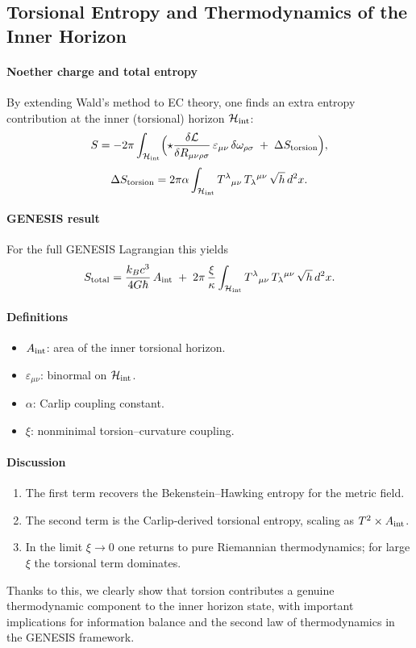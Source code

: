 \documentclass{article}
\begin{document}
\subsection{Torsional Entropy and Thermodynamics of the Inner Horizon}
\label{sec:inner-entropy}
\paragraph{Noether charge and total entropy}
By extending Wald’s method to EC theory, one finds an extra entropy contribution at the inner (torsional) horizon $\mathcal H_{\rm int}$:
\[
  S
  = -2\pi\int_{\mathcal H_{\rm int}}
      \Bigl(
        \star\frac{\delta\mathcal L}{\delta R_{\mu\nu\rho\sigma}}
           \,\varepsilon_{\mu\nu}\,\delta\omega_{\rho\sigma}
      \;+\;\Delta S_{\rm torsion}
      \Bigr),
\]
\[
  \Delta S_{\rm torsion}
  = 2\pi\alpha\int_{\mathcal H_{\rm int}}
      T^\lambda{}_{\mu\nu}\,T_\lambda{}^{\mu\nu}\,\sqrt{h}\,d^2x.
\]

\paragraph{GENESIS result}
For the full GENESIS Lagrangian this yields
\[
  S_{\rm total}
  = \frac{k_Bc^3}{4G\hbar}\,A_{\rm int}
  \;+\;
  2\pi\,\frac{\xi}{\kappa}
  \int_{\mathcal H_{\rm int}}
  T^\lambda{}_{\mu\nu}\,T_\lambda{}^{\mu\nu}\,\sqrt{h}\,d^2x.
\]

\paragraph{Definitions}
\begin{itemize}
  \item $A_{\rm int}$: area of the inner torsional horizon.
  \item $\varepsilon_{\mu\nu}$: binormal on $\mathcal H_{\rm int}$.
  \item $\alpha$: Carlip coupling constant.
  \item $\xi$: nonminimal torsion–curvature coupling.
\end{itemize}

\paragraph{Discussion}
\begin{enumerate}
  \item The first term recovers the Bekenstein–Hawking entropy for the metric field.  
  \item The second term is the Carlip‐derived torsional entropy, scaling as $T^2\times A_{\rm int}$.  
  \item In the limit $\xi\!\to\!0$ one returns to pure Riemannian thermodynamics; for large $\xi$ the torsional term dominates.  
\end{enumerate}
Thanks to this, we clearly show that torsion contributes a genuine thermodynamic component to the inner horizon state, with important implications for information balance and the second law of thermodynamics in the GENESIS framework.
\end{document}
